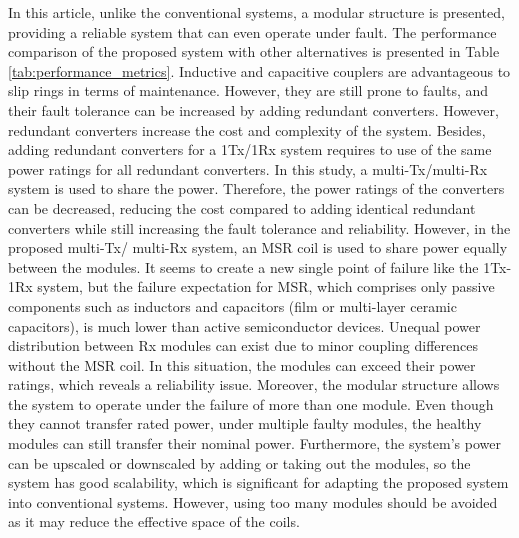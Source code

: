 \documentclass[journal]{IEEEtran}
\begin{document}
In this article, unlike the conventional systems, a modular structure is presented, providing a reliable system that can even operate under fault. 
The performance comparison of the proposed system with other alternatives is presented in Table \ref{tab:performance_metrics}. Inductive and capacitive couplers are advantageous to slip rings in terms of maintenance. However, they are still prone to faults, and their fault tolerance can be increased by adding redundant converters. 
However, redundant converters increase the cost and complexity of the system.
Besides, adding redundant converters for a 1Tx/1Rx system requires to use of the same power ratings for all redundant converters. 
In this study, a multi-Tx/multi-Rx system is used to share the power.
Therefore, the power ratings of the converters can be decreased, reducing the cost compared to adding identical redundant converters while still increasing the fault tolerance and reliability.
However,  in the proposed multi-Tx/ multi-Rx system, an MSR coil is used to share power equally between the modules. 
It seems to create a new single point of failure like the 1Tx-1Rx system, but the failure expectation for MSR, which comprises only passive components such as inductors and capacitors (film or multi-layer ceramic capacitors), is much lower than active semiconductor devices. 
Unequal power distribution between Rx modules can exist due to minor coupling differences without the MSR coil. In this situation, the modules can exceed their power ratings, which reveals a reliability issue.
Moreover, the modular structure allows the system to operate under the failure of more than one module. 
Even though they cannot transfer rated power, under multiple faulty modules, the healthy modules can still transfer their nominal power.
Furthermore, the system's power can be upscaled or downscaled by adding or taking out the modules, so the system has good scalability, which is significant for adapting the proposed system into conventional systems.
However, using too many modules should be avoided as it may reduce the effective space of the coils. 
\end{document}
